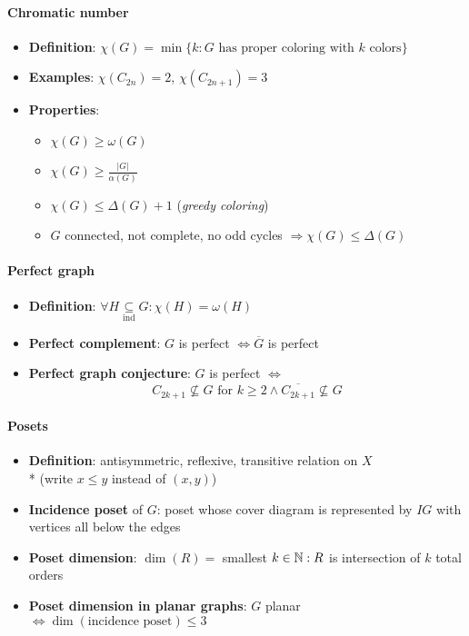 \paragraph{Chromatic number}
\begin{itemize}
  \item \textbf{Definition}: $ \chi(G) = \min\{ k: G \text{ has proper coloring with } k \text{ colors} \} $ 
  \item \textbf{Examples}: $ \chi(C_{2n}) = 2 $, $ \chi(C_{2n+1}) = 3 $
  \item \textbf{Properties}:
  \begin{itemize}
    \item $ \chi(G) \geq \omega(G) $ 
    \item $ \chi(G) \geq \frac{\vert G \vert}{\alpha(G)} $
    \item $ \chi(G) \leq \Delta(G) + 1 $ (\emph{greedy coloring})
    \item $ G $ connected, not complete, no odd cycles $ \Rightarrow \chi(G) \leq \Delta(G) $
  \end{itemize}
\end{itemize}

\paragraph{Perfect graph}
\begin{itemize}
  \item \textbf{Definition}: $ \forall H \underset{\text{ind}}{\subseteq} G : \chi(H) = \omega(H) $
  \item \textbf{Perfect complement}: $ G $ is perfect $ \Leftrightarrow \overline{G} $ is perfect
  \item \textbf{Perfect graph conjecture}: $ G $ is perfect $ \Leftrightarrow $
    \begin{equation*}
      C_{2k+1} \not \subseteq G \text{ for } k \geq 2 \wedge \overline{C_{2k+1}} \not \subseteq G
    \end{equation*}
\end{itemize}

\paragraph{Posets}
\begin{itemize}
  \item \textbf{Definition}: antisymmetric, reflexive, transitive relation on $ X $ \\* (write $ x \leq y $ instead of $ (x,y) $) 
  \item \textbf{Incidence poset} of $ G $: poset whose cover diagram is represented by $ IG $ with vertices all below the edges
  \item \textbf{Poset dimension}: $ \dim(R) = $ smallest $ k \in \mathbb{N} : R $ is intersection of $ k $ total orders
  \item \textbf{Poset dimension in planar graphs}: $ G $ planar $ \Leftrightarrow \dim(\text{incidence poset}) \leq 3 $
\end{itemize}

